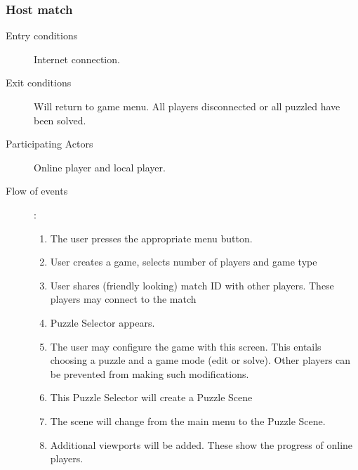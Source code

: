 \documentclass[12pt]{article}
\begin{document}
    \subsubsection{Host match}
    \begin{description}
        \item[Entry conditions] Internet connection.
        \item[Exit conditions] Will return to game menu. All players
            disconnected or all puzzled have been solved.
        \item[Participating Actors] Online player and local player.
        \item[Flow of events]:
            \begin{enumerate}
                \item The user presses the appropriate menu button.
                \item User creates a game, selects number of players and game
                    type
                \item User shares (friendly looking) match ID with other
                    players. These players may connect to the match
                \item Puzzle Selector appears.
                \item The user may configure the game with this screen.
                    This
                    entails choosing a puzzle and a game mode (edit or solve).
                    Other players can be prevented from making such
                    modifications.
                \item This Puzzle Selector will create a Puzzle Scene
                \item The scene will change from the main menu to the Puzzle
                    Scene.
                \item Additional viewports will be added. These show the
                    progress of online players.

            \end{enumerate}
    \end{description}

\end{document}
